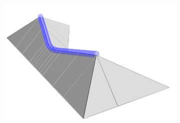 \begin{figure}
\setlength{\figwidth}{.22\textwidth}
\setlength{\figwidthTwo}{.17\textwidth}
\setlength{\figwidthTree}{.22\textwidth}
\setlength{\tempheight}{-0.3cm}
\setlength{\tempheightTwo}{-0.5cm}
\begin{subfigure}{\figwidth}\centering
\hspace*{\tempheightTwo}
\includegraphics[height=\figheight]{sources-method-overview-surface-marking-cropped.png}

\vspace{\tempheight}


\end{subfigure}
\end{figure}
